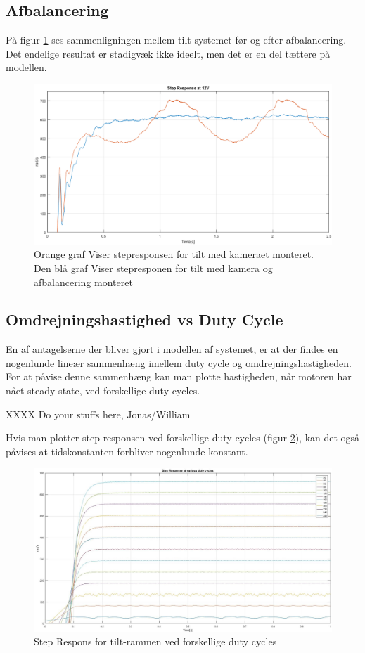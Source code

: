 \subsection{Afbalancering}

På figur \ref{fig:Balanced_Response} ses sammenligningen mellem tilt-systemet før og efter afbalancering. Det endelige resultat er stadigvæk ikke ideelt, men det er en del tættere på modellen.

\begin{figure}[!hb]
	\begin{center}
		\includegraphics[scale=0.45]{Billeder/balanced_vs_unbalanced.png}
	\end{center}
	\caption{Orange graf Viser stepresponsen for tilt med kameraet monteret. Den blå graf Viser stepresponen for tilt med kamera og afbalancering monteret}
	\label{fig:Balanced_Response}
\end{figure}

\subsection{Omdrejningshastighed vs Duty Cycle}

En af antagelserne der bliver gjort i modellen af systemet, er at der findes en nogenlunde lineær sammenhæng imellem duty cycle og omdrejningshastigheden. For at påvise denne sammenhæng kan man plotte hastigheden, når motoren har nået steady state, ved forskellige duty cycles. 

XXXX Do your stuffs here, Jonas/William

Hvis man plotter step responsen ved forskellige duty cycles (figur \ref{fig:RPM_DC}), kan det også påvises at tidskonstanten forbliver nogenlunde konstant. 

\begin{figure}[!ht]
	\begin{center}
		\includegraphics[scale=0.35]{Billeder/RPM_vs_DC.jpg}
	\end{center}
	\caption{Step Respons for tilt-rammen ved forskellige duty cycles}
	\label{fig:RPM_DC}
\end{figure}